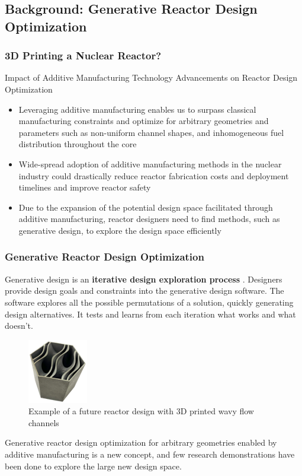\subsection{Background: Generative Reactor Design Optimization}
\begin{frame}
    \frametitle{3D Printing a Nuclear Reactor?}
    \begin{block}{Impact of Additive Manufacturing Technology Advancements on 
        Reactor Design Optimization}
        \begin{itemize}
            \item Leveraging additive manufacturing enables us to surpass classical 
            manufacturing constraints and optimize for arbitrary geometries and parameters 
            such as non-uniform channel shapes, and inhomogeneous fuel distribution 
            throughout the core
            \item Wide-spread adoption of additive manufacturing methods in the nuclear industry 
            could drastically reduce reactor fabrication costs and deployment timelines 
            and improve reactor safety
            \item Due to the expansion of the potential design space facilitated through 
            additive manufacturing, reactor designers need to find methods, such as 
            generative design, to explore the design space efficiently
          \end{itemize}
    \end{block}
  \end{frame}

  \begin{frame}
    \frametitle{Generative Reactor Design Optimization}
    Generative design is an \textbf{iterative design exploration process} \cite{autodesk_autodesk_2020}. 
    Designers provide design goals and constraints into the generative design software. 
    The software explores all the possible permutations of a solution, quickly generating 
    design alternatives. 
    It tests and learns from each iteration what works and what doesn't.

    \begin{figure}[]
        \includegraphics[width=0.2\linewidth]{figures/wavy-channels.png}
        \caption{Example of a future reactor design with 3D printed wavy flow channels}
    \end{figure}

    Generative reactor design optimization for arbitrary geometries enabled by additive 
    manufacturing is a new concept, and few research demonstrations have been done to 
    explore the large new design space.

  \end{frame}

